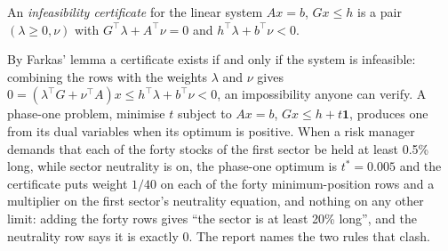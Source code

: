 \begin{omfigure}

\label{fig:qm:convex-optimisation:costs}
\end{omfigure}

\begin{definition}\label{def:qm:convex-optimisation:certificate}
An \emph{infeasibility certificate} for the linear system $Ax = b$, $Gx \le h$ is a pair $(\lambda \ge 0, \nu)$ with $G^\top\lambda + A^\top\nu = 0$ and
$h^\top\lambda + b^\top\nu < 0$.
\end{definition}

By Farkas' lemma a certificate exists if and only if the system is infeasible: combining the rows with the weights $\lambda$ and $\nu$ gives $0 = (\lambda^\top G + \nu^\top A)x \le
h^\top\lambda + b^\top\nu < 0$, an impossibility anyone can verify. A phase-one problem, minimise $t$ subject to $Ax = b$, $Gx \le h + t\mathbf 1$, produces one from its dual variables when
its optimum is positive. When a risk manager demands that each of the forty stocks of the first sector be held at least 0.5\% long, while sector neutrality is on, the phase-one
optimum is $t^* = 0.005$ and the certificate puts weight $1/40$ on each of the forty minimum-position rows and a multiplier on the first sector's neutrality equation, and nothing on any
other limit: adding the forty rows gives ``the sector is at least 20\% long'', and the neutrality row says it is exactly 0. The report names the two rules that clash.

